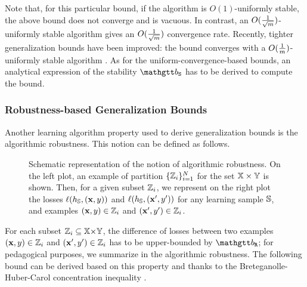 Note that, for this particular bound, if the algorithm is $O(1)$-uniformly stable, the above bound does not converge and is vacuous.
In contrast, an $O(\frac{1}{\sqrt{\m}})$-uniformly stable algorithm gives an $O(\frac{1}{\sqrt{\m}})$ convergence rate.
Recently, tighter generalization bounds have been improved: the bound converges with a $O(\frac{1}{\m})$-uniformly stable algorithm \citep{FeldmanVondrak2018,FeldmanVondrak2019,BousquetKlochkovZhivotovskiy2020}.
As for the uniform-convergence-based bounds, an analytical expression of the stability $\stab$ has to be derived to compute the bound.

\subsubsection{Robustness-based Generalization Bounds}

Another learning algorithm property used to derive generalization bounds is the algorithmic robustness.
This notion can be defined as follows.


\begin{figure}
    \centering
    
    \caption[Schematic Representation of the Algorithmic Robustness]{
    Schematic representation of the notion of algorithmic robustness. 
    On the left plot, an example of partition $\{\Z_i\}_{i=1}^{N}$ for the set $\X\times\Y$ is shown.
    Then, for a given subset $\Z_i$, we represent on the right plot the losses $\loss(\h_\S, (\x,\y))$ and $\loss(\h_\S, (\x', \y'))$ for any learning sample $\S$, and examples $(\x,\y)\in\Z_i$ and $(\x',\y')\in\Z_i$.
    }
    \label{chap:intro:fig:robustness}
\end{figure}
For each subset $\Z_i\subseteq \X{\times}\Y$, the difference of losses between two examples $(\x,\y)\in\Z_i$ and $(\x',\y')\in\Z_i$ has to be upper-bounded by $\rob$;
for pedagogical purposes, we summarize in  the algorithmic robustness.
The following bound can be derived based on this property and thanks to the Breteganolle-Huber-Carol concentration inequality \citep[Proposition A.6.6]{VaartWellner1996}.

